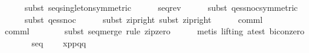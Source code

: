 \begin{isabellebody}
\ \ \ \ \isamarkupfalse%
\ {}subst\ seq{}singleton{}symmetric{}{}\isanewline
\ \ \ \ \isamarkupfalse%
\ seq{}rev\isanewline
\ \ \ \ \isamarkupfalse%
\ {}subst\ qes{}snoc{}symmetric{}{}{}\isanewline
\ \ \ \ \isamarkupfalse%
\ {}subst\ qes{}snoc{}\isanewline
\ \ \ \ \isamarkupfalse%
\ {}subst\ zip{}right{}\ subst\ zip{}right{}\isanewline
\ \ \ \ \isamarkupfalse%
\ {}comml{}\ {}\ {}{}\isanewline
\ \ \ \ \isamarkupfalse%
\ {}comml{}\ {}\ {}{}\isanewline
\ \ \ \ \isamarkupfalse%
\ {}subst\ seq{}merge{}\ rule\ zip{}zero{}\isanewline
\ \ \ \ \isamarkupfalse%
\ {}metis\ {}lifting{}\ a{}test\ bicon{}zero{}\isanewline
\isanewline
\ \ \isamarkupfalse%
\ \isamarkupfalse%
\ {}{}{}{}\ {}\ seq\isanewline
\ \ \ \ {}x{}{}p{}{}{}p{}{}{}q{}{}{}{}q{}{}{}\isanewline

\end{isabellebody}
